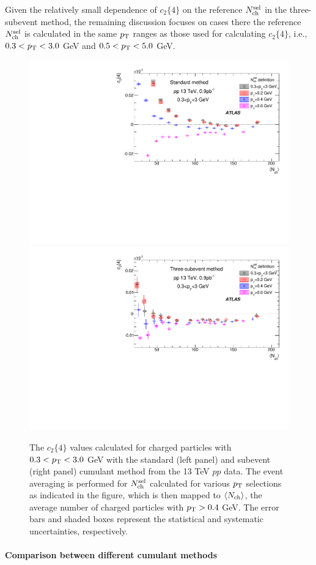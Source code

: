 Given the relatively small dependence of $c_2\{4\}$ on the reference $N_\text{ch}^\text{sel}$ in the three-subevent method, the remaining discussion focuses on cases there the reference $N_\text{ch}^\text{sel}$ is calculated in the same $p_\text{T}$ ranges as those used for calculating $c_2\{4\}$, i.e., $0.3<p_\text{T}<3.0$ GeV and $0.5<p_\text{T}<5.0$ GeV.

\begin{figure}[H]
\centering
\includegraphics[width=.475\linewidth]{figs/chapter_subcumu/ATLAS_c24_pT0_std_X2}
\includegraphics[width=.475\linewidth]{figs/chapter_subcumu/ATLAS_c24_pT0_sub_X2}
\caption{The $c_2\{4\}$ values calculated for charged particles with $0.3<p_\text{T}<3.0$ GeV with the standard (left panel) and subevent (right panel) cumulant method from the 13 TeV $pp$ data. The event averaging is performed for $N_\text{ch}^\text{sel}$ calculated for various $p_\text{T}$ selections as indicated in the figure, which is then mapped to $\left\langle N_\text{ch}\right\rangle$, the average number of charged particles with $p_\text{T}>0.4$ GeV. The error bars and shaded boxes represent the statistical and systematic uncertainties, respectively.}
\label{fig:subcumu_ATLAS_c24_pT0_X2}
\end{figure}



\paragraph{Comparison between different cumulant methods}
\label{comparison_between_different_cumulant_methods}

